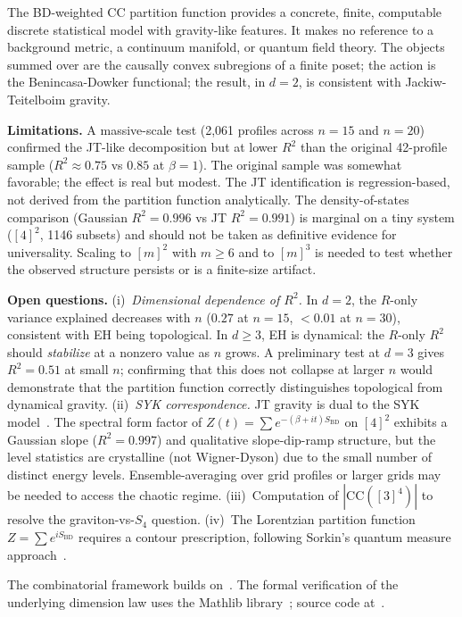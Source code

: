 \documentclass[aps,prd,twocolumn,superscriptaddress]{revtex4-2}
\begin{document}
The BD-weighted CC partition function provides a concrete, finite,
computable discrete statistical model with gravity-like features.
It makes no reference to a background metric, a continuum manifold,
or quantum field theory. The objects summed over are the causally
convex subregions of a finite poset; the action is the
Benincasa-Dowker functional; the result, in $d = 2$, is
consistent with Jackiw-Teitelboim gravity.

\textbf{Limitations.}
A massive-scale test (2{,}061 profiles across $n = 15$ and $n = 20$)
confirmed the JT-like decomposition but at lower $R^2$ than the
original 42-profile sample ($R^2 \approx 0.75$ vs $0.85$ at
$\beta = 1$). The original sample was somewhat favorable; the
effect is real but modest. The JT identification is
regression-based, not derived from the partition function analytically.
The density-of-states comparison (Gaussian $R^2 = 0.996$ vs JT
$R^2 = 0.991$) is marginal on a tiny system ($[4]^2$, 1146 subsets)
and should not be taken as definitive evidence for universality.
Scaling to $[m]^2$ with $m \geq 6$ and to $[m]^3$ is needed to
test whether the observed structure persists or is a finite-size
artifact.

\textbf{Open questions.} (i)~\emph{Dimensional dependence of $R^2$.}
In $d = 2$, the $R$-only variance explained decreases with $n$
($0.27$ at $n = 15$, $< 0.01$ at $n = 30$), consistent with EH
being topological. In $d \geq 3$, EH is dynamical: the
$R$-only $R^2$ should \emph{stabilize} at a nonzero value as $n$
grows. A preliminary test at $d = 3$ gives $R^2 = 0.51$ at small
$n$; confirming that this does not collapse at larger $n$ would
demonstrate that the partition function correctly distinguishes
topological from dynamical gravity.
(ii)~\emph{SYK correspondence.} JT gravity is dual to the SYK
model~\cite{SYK}. The spectral form factor of $Z(t) = \sum
e^{-(\beta + it) S_{\mathrm{BD}}}$ on $[4]^2$ exhibits a Gaussian
slope ($R^2 = 0.997$) and qualitative slope-dip-ramp structure, but
the level statistics are crystalline (not Wigner-Dyson) due to the
small number of distinct energy levels. Ensemble-averaging over grid
profiles or larger grids may be needed to access the chaotic regime.
(iii)~Computation of $|\mathrm{CC}([3]^4)|$ to resolve the
graviton-vs-$S_4$ question.
(iv)~The Lorentzian partition function
$Z = \sum e^{i S_{\mathrm{BD}}}$ requires a contour prescription,
following Sorkin's quantum measure approach~\cite{Sorkin1994}.


\begin{acknowledgments}
The combinatorial framework builds on~\cite{DiFioreCAG,DiFioreGrid}.
The formal verification of the underlying dimension law
uses the Mathlib library~\cite{mathlib}; source code at~\cite{leanrepo}.
\end{acknowledgments}
\end{document}
